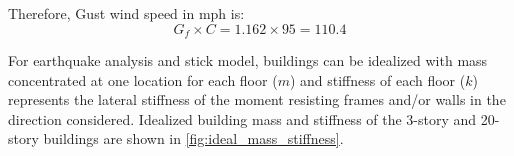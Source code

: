 \documentclass{simcenterdocumentation}
\begin{document}
Therefore, Gust wind speed in mph is:
\begin{equation*}
G_f \times C = 1.162 \times 95 = \boxed{110.4}
\end{equation*}


For earthquake analysis and stick model, buildings can be idealized with mass concentrated at one location for each floor ($m$) and stiffness of each floor ($k$) represents the lateral stiffness of the moment resisting frames and/or walls in the direction considered. Idealized building mass and stiffness of the 3-story and 20-story buildings are shown in \cref{fig:ideal_mass_stiffness}.
\end{document}
